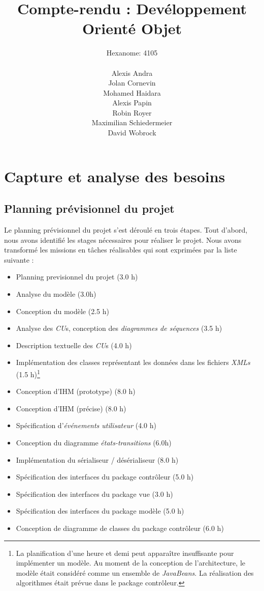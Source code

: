 \documentclass[10pt,a4paper]{book}
\author{Hexanome: 4105\\\\Alexis Andra\\Jolan Cornevin\\Mohamed Haidara\\Alexis Papin\\Robin Royer\\Maximilian Schiedermeier\\David Wobrock}
\title{Compte-rendu : Devéloppement Orienté Objet}
\begin{document}
\maketitle
\tableofcontents 
\chapter{Capture et analyse des besoins}
\section{Planning prévisionnel du projet}
Le planning prévisionnel du projet s'est déroulé en trois étapes. Tout d'abord, nous avons identifié les stages nécessaires pour réaliser le projet. Nous avons transformé les missions en tâches réalisables qui sont exprimées par la liste suivante :
\begin{itemize}
	\item{Planning previsionnel du projet (3.0 h)}
	\item{Analyse du modèle (3.0h)}
	\item{Conception du modèle (2.5 h)}
	\item{Analyse des \textit{CU}s, conception des \textit{diagrammes de séquences} (3.5 h)}
	\item{Description textuelle des \textit{CU}s (4.0 h)}
	\item{Implémentation des classes représentant les données dans les fichiers \textit{XMLs} (1.5 h)\footnote{La planification d'une heure et demi peut apparaître insuffisante pour implémenter un modèle. Au moment de la conception de l'architecture, le modèle était considéré comme un ensemble de \textit{JavaBeans}. La réalisation des algorithmes était prévue dans le package contrôleur.}}
	\item{Conception d'IHM (prototype) (8.0 h)}
	\item{Conception d'IHM (précise) (8.0 h)}
	\item{Spécification d'\textit{événements utilisateur} (4.0 h)}
	\item{Conception du diagramme \textit{états-transitions} (6.0h)}
	\item{Implémentation du sérialiseur / désérialiseur (8.0 h)}
	\item{Spécification des interfaces du package contrôleur (5.0 h)}
	\item{Spécification des interfaces du package vue (3.0 h)}
	\item{Spécification des interfaces du package modèle (5.0 h)}
	\item{Conception de diagramme de classes du package contrôleur (6.0 h)}

\end{itemize}
\end{document}

